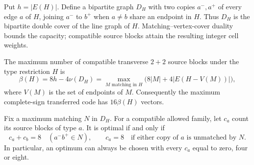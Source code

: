 Put $h=|E(H)|$. Define a bipartite graph $D_H$ with two copies $a^-,a^+$
of every edge $a$ of $H$, joining $a^-$ to $b^+$ when $a\ne b$ share
an endpoint in $H$. Thus $D_H$ is the bipartite double cover of the
line graph of $H$. Matching--vertex-cover duality bounds the capacity;
compatible source blocks attain the resulting integer cell weights.

\begin{theorem}
\label{thm:type-boundary-capacity}
The maximum number of compatible transverse $2+2$ source blocks under
the type restriction $H$ is
\begin{equation}\label{eq:type-boundary-capacity}
 \beta(H)=8h-4\nu(D_H)
 =\max_{M\text{ matching in }H}
       \bigl(8|M|+4|E(H-V(M))|\bigr),
\end{equation}
where $V(M)$ is the set of endpoints of $M$. Consequently the maximum
complete-sign transferred code has $16\beta(H)$ vectors.

Fix a maximum matching $N$ in $D_H$. For a compatible allowed family,
let $c_a$ count its source blocks of type $a$. It is optimal if and only if
\[
 c_a+c_b=8\quad(a^-b^+\in N),\qquad
 c_a=8\quad\text{if either copy of $a$ is unmatched by $N$}.
\]
In particular, an optimum can always be chosen with every $c_a$ equal
to zero, four or eight.
\end{theorem}
